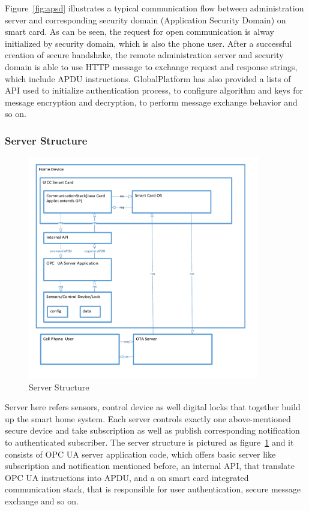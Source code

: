 \documentclass[]{llncs}
\begin{document}
Figure~\ref{fig:apsd} illustrates a typical communication flow between administration server and corresponding security domain (Application Security Domain) on smart card. As can be seen, the request for open communication is alway initialized by security domain, which is also the phone user. After a successful creation of secure handshake, the remote administration server and security domain is able to use HTTP message to exchange request and response strings, which include APDU instructions. GlobalPlatform has also provided  a lists of API used to initialize authentication process, to configure algorithm and keys for message  encryption and decryption, to perform message exchange  behavior and so on.

\subsubsection{Server Structure}

\begin{figure}
	\centering
	\includegraphics[width=0.9\textwidth]{serverStructure}
		\caption[ ]{Server Structure}
	\label{fig:serverStructure}
\end{figure}
Server here refers sensors, control device as well digital locks that together build up the smart home system. Each server controls exactly one above-mentioned secure device and take subscription as well as publish corresponding notification to authenticated subscriber. The server structure is pictured as figure~\ref{fig:serverStructure} and it consists of OPC UA server application code, which offers basic server like subscription and notification mentioned before, an internal API, that translate OPC UA instructions into APDU, and a on smart card integrated communication stack, that is responsible for user authentication, secure message exchange and so on.
\end{document}
